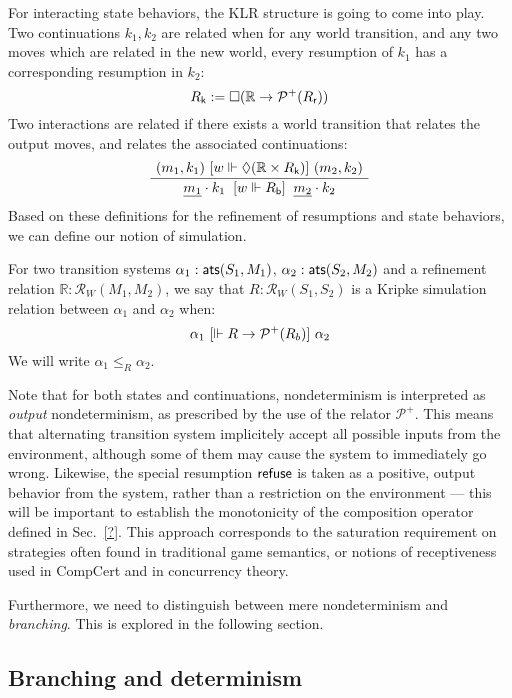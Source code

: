 For interacting state behaviors,
the KLR structure is going to come into play.
Two continuations $k_1, k_2$ are related when
for any world transition,
and any two moves which are related in the new world,
every resumption of $k_1$ has a corresponding resumption in $k_2$:
\[
  R_{ \mathsf{k} } := \Box (\mathbb{R} \rightarrow \mathcal{P}^+(R_{ \mathsf{r} }))
\]
Two interactions are related
if there exists a world transition that relates the output moves,
and relates the associated continuations:
\[
  \AxiomC{$(m_1, k_1) \ifr{w \Vdash \Diamond (\mathbb{R} \times R_\kw{k})} (m_2, k_2)$}
  \UnaryInfC{$
	{\underline{m_1} \cdot k_1}
	\: \ifr{w \Vdash R_\kw{b}} \:
	{\underline{m_2} \cdot k_2}$}
  \DisplayProof
\]
Based on these definitions for the refinement of
resumptions and state behaviors,
we can define our notion of simulation.

\begin{definition}
For two transition systems
$\alpha_1 :  \mathsf{ats} (S_1, M_1)$,
$\alpha_2 :  \mathsf{ats} (S_2, M_2)$ and
a refinement relation
$\mathbb{R} : \mathcal{R}_W(M_1, M_2)$,
we say that
$R : \mathcal{R}_W(S_1, S_2)$
is a Kripke simulation relation between $\alpha_1$ and $\alpha_2$
when:
\[
    \alpha_1 \ [{\Vdash R \rightarrow \mathcal{P}^+(R_b)}]\  \alpha_2
\]
We will write $\alpha_1 \le_R \alpha_2$.
\end{definition}

Note that for both states and continuations,
nondeterminism is interpreted as \emph{output} nondeterminism,
as prescribed by the use of the relator $\mathcal{P}^+$.
This means that alternating transition system
implicitely accept all possible inputs from the environment,
although some of them may cause the system to immediately go wrong.
Likewise,
the special resumption $ \mathsf{refuse} $
is taken as a positive, output behavior from the system,
rather than a restriction on the environment ---
this will be important to establish the monotonicity
of the composition operator defined in Sec.~\ref{?}.
This approach corresponds to the saturation requirement on strategies
often found in traditional game semantics,
or notions of receptiveness used in CompCert
and in concurrency theory.

Furthermore, we need to distinguish between mere nondeterminism
and \emph{branching}.
This is explored in the following section.

\subsection{Branching and determinism}

